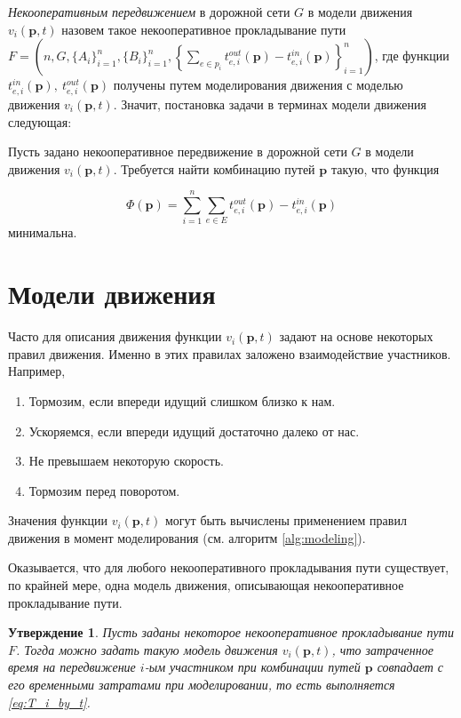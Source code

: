 \documentclass[12pt, a4paper]{article}
\newtheorem{state}{Утверждение}[section]
\begin{document}
\textit{Некооперативным передвижением} в дорожной сети $G$ в модели движения $v_i(\textbf{p}, t)$ назовем такое некооперативное прокладывание пути \\$F = \left(n, G, \{A_i\}_{i = 1}^{n}, \{B_i\}_{i = 1}^{n}, \left\{\sum\limits_{e \in p_i} t_{e, i}^{out}(\textbf{p}) - t_{e, i}^{in}(\textbf{p})\right\}_{i = 1}^{n}\right)$, где функции $t_{e, i}^{in}(\textbf{p}), \: t_{e, i}^{out}(\textbf{p})$ получены путем моделирования движения с моделью движения $v_i(\textbf{p}, t)$.
Значит, постановка задачи в терминах модели движения следующая:

Пусть задано некооперативное передвижение в дорожной сети $G$ в модели движения $v_i(\textbf{p}, t)$.
Требуется найти комбинацию путей $\textbf{p}$ такую, что функция 

\begin{equation}
\label{eq:target_task_end}
\Phi(\textbf{p}) =\sum \limits_{i = 1}^n \sum \limits_{e \in E} t_{e, i}^{out}(\textbf{p}) - t_{e, i}^{in}(\textbf{p})
\end{equation}
минимальна.


\newpage
\section{Модели движения}

\label{sec:models}
Часто для описания движения функции $v_i(\textbf{p}, t)$ задают на основе некоторых правил движения. Именно в этих правилах заложено взаимодействие участников. Например,  
\begin{enumerate}
	\item Тормозим, если впереди идущий слишком близко к нам.
	\item Ускоряемся, если впереди идущий достаточно далеко от нас.
	\item Не превышаем некоторую скорость.
	\item Тормозим перед поворотом.
\end{enumerate}
Значения функции $v_i(\textbf{p}, t)$ могут быть вычислены применением правил движения в момент моделирования (см. алгоритм \ref{alg:modeling}).

Оказывается, что для любого некооперативного прокладывания пути существует, по крайней мере, одна модель движения, описывающая некооперативное прокладывание пути.

\begin{state}
	\label{state:eqv}
	Пусть заданы некоторое некооперативное прокладывание пути $F$. Тогда можно задать такую модель движения $v_i(\textbf{p}, t)$, что затраченное время на передвижение $i$-ым участником при комбинации путей $\textbf{p}$ совпадает с его временными затратами при моделировании, то есть выполняется \eqref{eq:T_i_by_t}.
	
\end{state}
\end{document}
